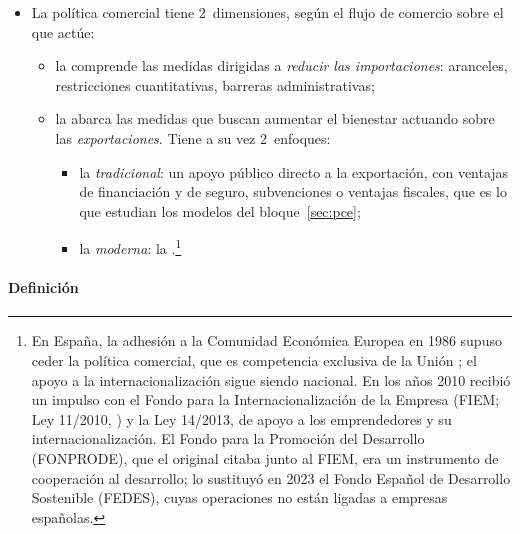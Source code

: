 \documentclass[11pt]{article}
\begin{document}
\begin{itemize}
\item La política comercial tiene 2~dimensiones, según el flujo de comercio sobre el que actúe:
  \begin{itemize}
  \item la  comprende las medidas dirigidas a \emph{reducir las importaciones}: aranceles, restricciones cuantitativas, barreras administrativas;
  \item la  abarca las medidas que buscan aumentar el bienestar actuando sobre las \emph{exportaciones}. Tiene a su vez 2~enfoques:
    \begin{itemize}
    \item la \emph{tradicional}: un apoyo público directo a la exportación, con ventajas de financiación y de seguro, subvenciones o ventajas fiscales, que es lo que estudian los modelos del bloque~\ref{sec:pce};
    \item la \emph{moderna}: la .\footnote{En España, la adhesión a la Comunidad Económica Europea en 1986 supuso ceder la política comercial, que es competencia exclusiva de la Unión ; el apoyo a la internacionalización sigue siendo nacional. En los años 2010 recibió un impulso con el Fondo para la Internacionalización de la Empresa (FIEM; Ley 11/2010, \cite{BOE2010FIEM}) y la Ley 14/2013, de apoyo a los emprendedores y su internacionalización\nocite{BOE2013Emprendedores}. El Fondo para la Promoción del Desarrollo (FONPRODE), que el original citaba junto al FIEM, era un instrumento de cooperación al desarrollo; lo sustituyó en 2023 el Fondo Español de Desarrollo Sostenible (FEDES), cuyas operaciones no están ligadas a empresas españolas\nocite{BOE2023Cooperacion,BOE2025FEDES}.}
    \end{itemize}
  \end{itemize}
\end{itemize}

\paragraph{Definición}
\end{document}
